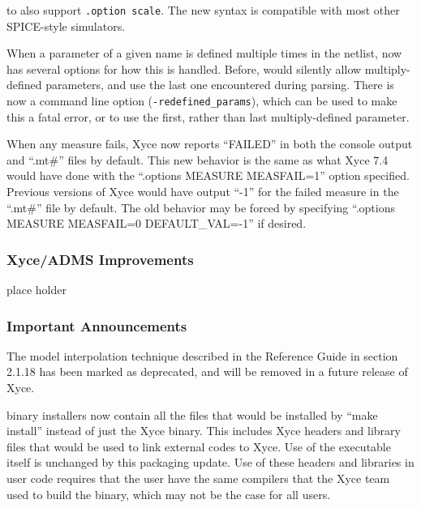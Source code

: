 \documentclass[letterpaper]{scrartcl}
\begin{document}
\begin{XyceItemize}
   to also support \texttt{.option scale}.  The new syntax is
   compatible with most other SPICE-style simulators.
 \item When a parameter of a given name is defined multiple times in
   the netlist, \Xyce{} now has several options for how this is
   handled.  Before, \Xyce{} would silently allow multiply-defined
   parameters, and use the last one encountered during parsing.  There
   is now a command line option (\texttt{-redefined\_params}), which
   can be used to make this a fatal error, or to use the first, rather
   than last multiply-defined parameter.
 \item When any measure fails, Xyce now reports ``FAILED'' in both the
   console output and ``.mt\#'' files by default.  This new behavior is
   the same as what Xyce 7.4 would have done with the ``.options
   MEASURE MEASFAIL=1'' option specified.  Previous versions of Xyce
   would have output ``-1'' for the failed measure in the ``.mt\#''
   file by default.  The old behavior may be forced by specifying
   ``.options MEASURE MEASFAIL=0 DEFAULT\_VAL=-1'' if desired.
\end{XyceItemize}

\subsubsection*{Xyce/ADMS Improvements}
\begin{XyceItemize}
  \item place holder
\end{XyceItemize}

\subsubsection*{Important Announcements}
\begin{XyceItemize}
\item The model interpolation technique described in the \Xyce{}
  Reference Guide in section 2.1.18 has been marked as deprecated, and
  will be removed in a future release of Xyce.
\item \Xyce{} binary installers now contain all the files that would
  be installed by ``make install'' instead of just the Xyce binary.
  This includes Xyce headers and library files that would be used to
  link external codes to Xyce.  Use of the \Xyce{} executable itself
  is unchanged by this packaging update.  Use of these headers and
  libraries in user code requires that the user have the same
  compilers that the Xyce team used to build the binary, which may not
  be the case for all users.
\end{XyceItemize}
\end{document}
